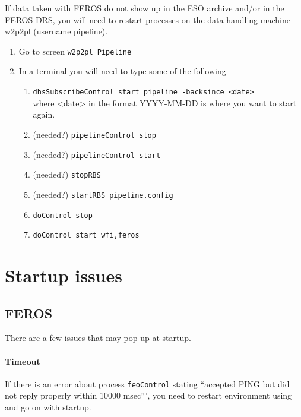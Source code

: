 \documentclass[11pt,fleqn,a4paper]{book}
\begin{document}
If data taken with FEROS do not show up in the ESO archive and/or in the
FEROS DRS, you will need to restart processes on the data handling machine \gls{w2p2pl} (username pipeline).

\label{proc:DHrestart}
\begin{enumerate} 
    \item Go to screen \texttt{\gls{w2p2pl} Pipeline}
    \item In a terminal you will need to type some of the following
        \begin{enumerate}
            \item \texttt{dhsSubscribeControl start pipeline -backsince <date>}\\where <date> in the format YYYY-MM-DD is where you want to start again.
            \item (needed?) \texttt{pipelineControl stop}
            \item (needed?) \texttt{pipelineControl start}
            \item (needed?) \texttt{stopRBS}
            \item (needed?) \texttt{startRBS pipeline.config}
            \item \texttt{doControl stop}
            \item \texttt{doControl start wfi,feros}
        \end{enumerate}
\end{enumerate}

\section{Startup issues}

\subsection{FEROS}
\label{sec:ferosstartuptimeout}

There are a few issues that may pop-up at startup.

\paragraph{Timeout}

If there is an error about process \texttt{feoControl} stating ``accepted PING but did not reply properly within 10000 msec''', you need to restart \gls{environment} using  and go on with startup.
\end{document}
